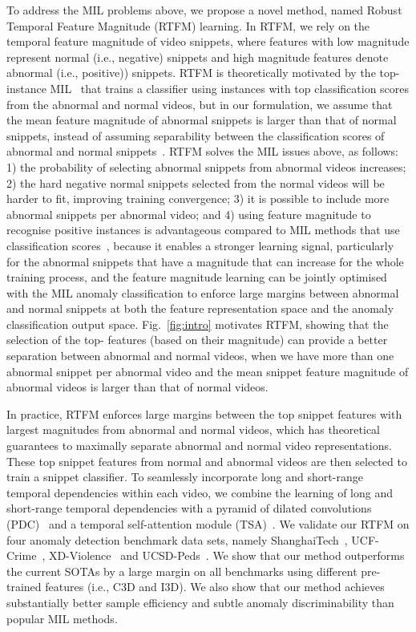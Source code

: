 \documentclass[10pt,twocolumn,letterpaper]{article}
\begin{document}
To address the MIL problems above, we propose a novel method, named 
Robust Temporal Feature Magnitude (RTFM) learning. 
In RTFM, we rely on the temporal feature magnitude of video snippets, where features with low magnitude represent normal (i.e., negative) snippets and high magnitude features denote abnormal (i.e., positive)) snippets.
RTFM is theoretically motivated by the top- instance MIL~\cite{li2015multiple} that trains a classifier using  instances with top classification scores from the abnormal and normal videos, but in our formulation, we assume that the mean feature magnitude 
of abnormal snippets is larger than that of normal snippets, instead of assuming separability between the classification scores of abnormal and normal snippets~\cite{li2015multiple}.
RTFM solves the MIL issues above, as follows: 1) the probability of selecting abnormal snippets from abnormal videos increases; 2) the hard negative normal snippets selected from the normal videos will be harder to fit, improving training convergence; 3) it is possible to include more abnormal snippets per abnormal video; and 4) using feature magnitude to recognise positive instances is advantageous compared to MIL methods that use classification scores~\cite{sultani2018real,li2015multiple}, because it enables a stronger learning signal, particularly for the abnormal snippets that have a magnitude that can increase for the whole training process, and the feature magnitude learning can be jointly optimised with the MIL anomaly classification to enforce large margins between abnormal and normal snippets at both the feature representation space and the anomaly classification output space. 
Fig.~\ref{fig:intro} motivates RTFM, showing that the selection of the top- features (based on their magnitude) can provide a better separation between abnormal and normal videos, when we have more than one abnormal snippet per abnormal video and the mean snippet feature magnitude of abnormal videos is larger than that of normal videos.

In practice, RTFM enforces large margins between the top  snippet features with largest magnitudes from abnormal and normal videos, which has theoretical guarantees to maximally separate abnormal and normal video representations.
These top  snippet features from normal and abnormal videos are then selected to train a snippet classifier. 
To seamlessly incorporate long and short-range temporal dependencies within each video, we combine the learning of long and short-range temporal dependencies with a pyramid of dilated convolutions (PDC)~\cite{yu2015multi} and a temporal self-attention module (TSA)~\cite{wang2018non}.
We validate our RTFM on four anomaly detection benchmark data sets, namely ShanghaiTech~\cite{liu2018future}, UCF-Crime~\cite{sultani2018real}, XD-Violence~\cite{Wu2020not} and UCSD-Peds~\cite{li2013anomaly}. We show that our method outperforms the current SOTAs by a large margin on all benchmarks using different pre-trained features (i.e., C3D and I3D). We also show that our method achieves substantially better sample efficiency and subtle anomaly discriminability than popular MIL methods.
\end{document}
